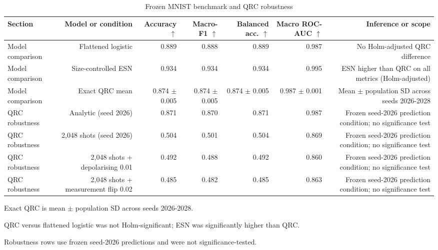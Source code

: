 \begin{table}[t]
\centering
\small
\caption{Frozen MNIST benchmark and QRC robustness}
\begin{tabular}{lrrrrrr}
\toprule
Section & Model or condition & Accuracy $\uparrow$ & Macro-F1 $\uparrow$ & Balanced acc. $\uparrow$ & Macro ROC-AUC $\uparrow$ & Inference or scope \\
\midrule
Model comparison & Flattened logistic & 0.889 & 0.888 & 0.889 & 0.987 & No Holm-adjusted QRC difference \\
Model comparison & Size-controlled ESN & 0.934 & 0.934 & 0.934 & 0.995 & ESN higher than QRC on all metrics (Holm-adjusted) \\
Model comparison & Exact QRC mean & 0.874 $\pm$ 0.005 & 0.874 $\pm$ 0.005 & 0.874 $\pm$ 0.005 & 0.987 $\pm$ 0.001 & Mean $\pm$ population SD across seeds 2026-2028 \\
QRC robustness & Analytic (seed 2026) & 0.871 & 0.870 & 0.871 & 0.987 & Frozen seed-2026 prediction condition; no significance test \\
QRC robustness & 2,048 shots (seed 2026) & 0.504 & 0.501 & 0.504 & 0.869 & Frozen seed-2026 prediction condition; no significance test \\
QRC robustness & 2,048 shots + depolarising 0.01 & 0.492 & 0.488 & 0.492 & 0.860 & Frozen seed-2026 prediction condition; no significance test \\
QRC robustness & 2,048 shots + measurement flip 0.02 & 0.485 & 0.482 & 0.485 & 0.863 & Frozen seed-2026 prediction condition; no significance test \\
\bottomrule
\end{tabular}
\parbox{0.98\linewidth}{\footnotesize Exact QRC is mean $\pm$ population SD across seeds 2026-2028.}
\parbox{0.98\linewidth}{\footnotesize QRC versus flattened logistic was not Holm-significant; ESN was significantly higher than QRC.}
\parbox{0.98\linewidth}{\footnotesize Robustness rows use frozen seed-2026 predictions and were not significance-tested.}
\end{table}
